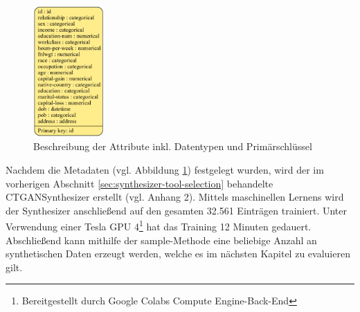 \begin{spacing}{1.5}
\begin{figure}[ht]
\begin{center}
\includegraphics[width=0.24\textwidth]{img/metadata.png}
\caption[Beschreibung der Attribute inkl. Datentypen und Primärschlüssel]{Beschreibung der Attribute inkl. Datentypen und Primärschlüssel}
\label{fig:metadata}
\end{center}
\end{figure}

Nachdem die Metadaten (vgl. Abbildung \ref{fig:metadata}) festgelegt wurden, wird der im vorherigen Abschnitt \ref{sec:synthesizer-tool-selection} behandelte CTGANSynthesizer erstellt (vgl. Anhang 2). Mittels maschinellen Lernens wird der Synthesizer anschließend auf den gesamten 32.561 Einträgen trainiert. Unter Verwendung einer Tesla GPU 4\footnote{Bereitgestellt durch Google Colabs Compute Engine-Back-End} hat das Training 12 Minuten gedauert. Abschließend kann mithilfe der sample-Methode eine beliebige Anzahl an synthetischen Daten erzeugt werden, welche es im nächsten Kapitel zu evaluieren gilt.

\end{spacing}